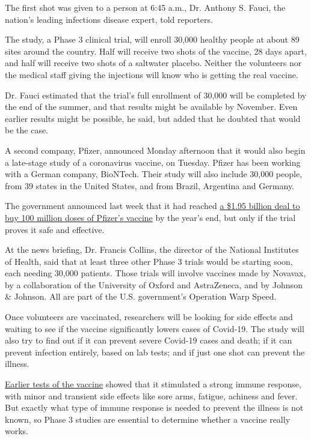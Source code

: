 The first shot was given to a person at 6:45 a.m., Dr. Anthony S. Fauci,
the nation's leading infections disease expert, told reporters.

The study, a Phase 3 clinical trial, will enroll 30,000 healthy people
at about 89 sites around the country. Half will receive two shots of the
vaccine, 28 days apart, and half will receive two shots of a saltwater
placebo. Neither the volunteers nor the medical staff giving the
injections will know who is getting the real vaccine.

Dr. Fauci estimated that the trial's full enrollment of 30,000 will be
completed by the end of the summer, and that results might be available
by November. Even earlier results might be possible, he said, but added
that he doubted that would be the case.

A second company, Pfizer, announced Monday afternoon that it would also
begin a late-stage study of a coronavirus vaccine, on Tuesday. Pfizer
has been working with a German company, BioNTech. Their study will also
include 30,000 people, from 39 states in the United States, and from
Brazil, Argentina and Germany.

The government announced last week that it had reached
\href{https://www.nytimes.com/2020/07/22/us/politics/pfizer-coronavirus-vaccine.html}{a
\$1.95 billion deal to buy 100 million doses of Pfizer's vaccine} by the
year's end, but only if the trial proves it safe and effective.

At the news briefing, Dr. Francis Collins, the director of the National
Institutes of Health, said that at least three other Phase 3 trials
would be starting soon, each needing 30,000 patients. Those trials will
involve vaccines made by Novavax, by a collaboration of the University
of Oxford and AstraZeneca, and by Johnson \& Johnson. All are part of
the U.S. government's Operation Warp Speed.

Once volunteers are vaccinated, researchers will be looking for side
effects and waiting to see if the vaccine significantly lowers cases of
Covid-19. The study will also try to find out if it can prevent severe
Covid-19 cases and death; if it can prevent infection entirely, based on
lab tests; and if just one shot can prevent the illness.

\href{https://slack-redir.net/link?url=https\%3A\%2F\%2Fwww.nytimes.com\%2F2020\%2F07\%2F14\%2Fhealth\%2Fcornavirus-vaccine-moderna.html\%3FsearchResultPosition\%3D5}{Earlier
tests of the vaccine} showed that it stimulated a strong immune
response, with minor and transient side effects like sore arms, fatigue,
achiness and fever. But exactly what type of immune response is needed
to prevent the illness is not known, so Phase 3 studies are essential to
determine whether a vaccine really works.

